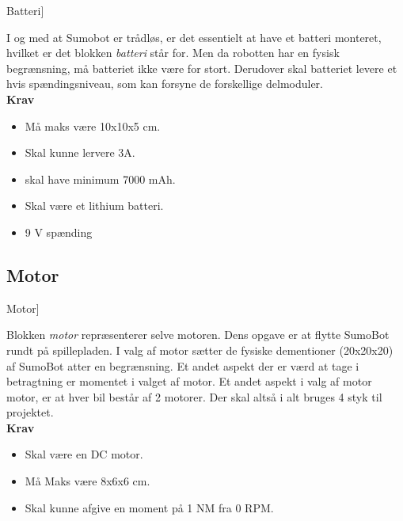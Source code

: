 \begin{PartBlokDescription}{Batteri]}{}
\BlokSpacer{0.4cm}
\end{PartBlokDescription}

I og med at Sumobot er trådløs, er det essentielt at have et batteri monteret, hvilket er det blokken \textit{batteri} står for. Men da robotten har en fysisk begrænsning, må batteriet ikke være for stort. Derudover skal batteriet levere et hvis spændingsniveau, som kan forsyne de forskellige delmoduler.
\\
\textbf{Krav}
\begin{itemize}
\item Må maks være 10x10x5 cm. \tbr
\item Skal kunne lervere 3A.
\item skal have minimum 7000 mAh. \tbr
\item Skal være et lithium batteri.
\item 9 V spænding\tbr
\end{itemize}


\subsection{Motor}

\begin{PartBlokDescription}{Motor]}{}
\BlokSpacer{0cm}
\end{PartBlokDescription}

Blokken \textit{motor} repræsenterer selve motoren. Dens opgave er at flytte SumoBot rundt på spillepladen.
I valg af motor sætter de fysiske dementioner (20x20x20) af SumoBot atter en begrænsning. Et andet aspekt der er værd at tage i betragtning er momentet i valget af motor.
Et andet aspekt i valg af motor motor, er at hver bil består af 2 motorer. Der skal altså i alt bruges 4 styk til projektet. \tbd
\\
\textbf{Krav}
\begin{itemize}
\item Skal være en DC motor.
\item Må Maks være 8x6x6 cm.
\item Skal kunne afgive en moment på 1 NM fra 0 RPM.\tbr
\end{itemize}


